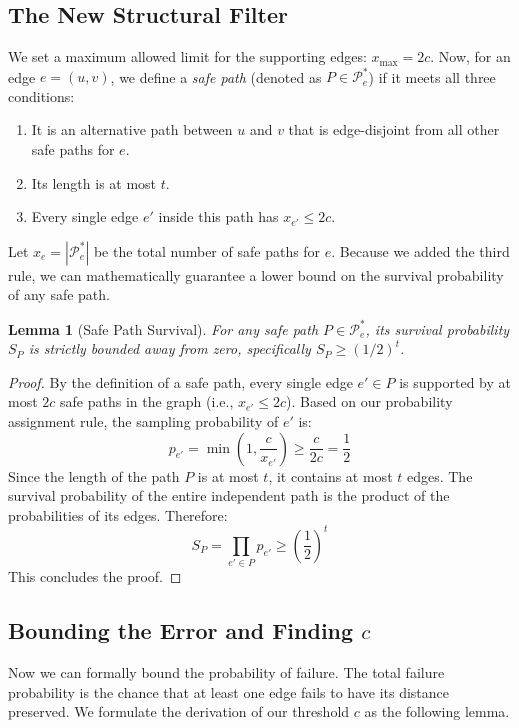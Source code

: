 \documentclass[11pt,a4paper]{article}
\newtheorem{lemma}{Lemma}[section]
\begin{document}
\subsection{The New Structural Filter}
We set a maximum allowed limit for the supporting edges: $x_{\max} = 2c$. Now, for an edge $e=(u,v)$, we define a \emph{safe path} (denoted as $P \in \mathcal{P}^*_e$) if it meets all three conditions:
\begin{enumerate}
    \item It is an alternative path between $u$ and $v$ that is edge-disjoint from all other safe paths for $e$.
    \item Its length is at most $t$.
    \item Every single edge $e'$ inside this path has $x_{e'} \le 2c$.
\end{enumerate}

Let $x_e = |\mathcal{P}^*_e|$ be the total number of safe paths for $e$. Because we added the third rule, we can mathematically guarantee a lower bound on the survival probability of any safe path.

\begin{lemma}[Safe Path Survival]\label{lem:safe_path_survival}
For any safe path $P \in \mathcal{P}^*_e$, its survival probability $S_P$ is strictly bounded away from zero, specifically $S_P \ge (1/2)^t$.
\end{lemma}

\begin{proof}
By the definition of a safe path, every single edge $e' \in P$ is supported by at most $2c$ safe paths in the graph (i.e., $x_{e'} \le 2c$). Based on our probability assignment rule, the sampling probability of $e'$ is:
\[
p_{e'} = \min\left(1, \frac{c}{x_{e'}}\right) \ge \frac{c}{2c} = \frac{1}{2}
\]
Since the length of the path $P$ is at most $t$, it contains at most $t$ edges. The survival probability of the entire independent path is the product of the probabilities of its edges. Therefore:
\[
S_P = \prod_{e' \in P} p_{e'} \ge \left(\frac{1}{2}\right)^t
\]
This concludes the proof.
\end{proof}

\subsection{Bounding the Error and Finding $c$}
Now we can formally bound the probability of failure. The total failure probability is the chance that at least one edge fails to have its distance preserved. We formulate the derivation of our threshold $c$ as the following lemma.
\end{document}
